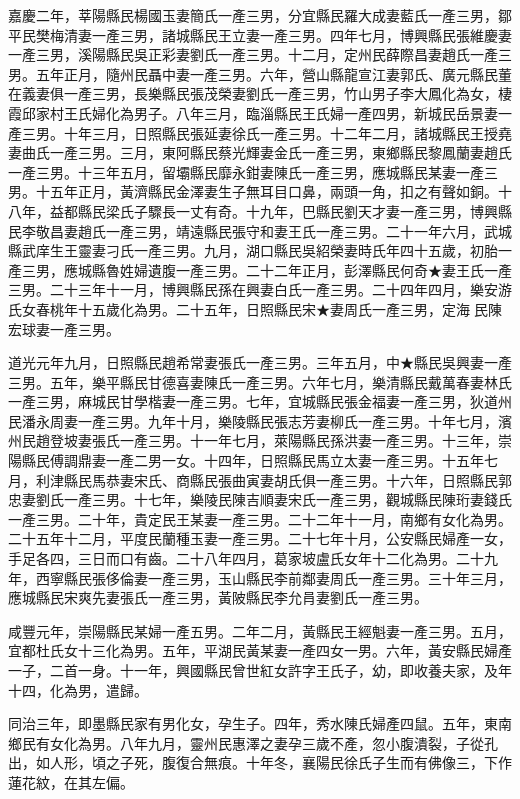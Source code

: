 \begin{pinyinscope}
嘉慶二年，莘陽縣民楊國玉妻簡氏一產三男，分宜縣民羅大成妻藍氏一產三男，鄒平民樊梅清妻一產三男，諸城縣民王立妻一產三男。四年七月，博興縣民張維慶妻一產三男，溪陽縣民吳正彩妻劉氏一產三男。十二月，定州民薛際昌妻趙氏一產三男。五年正月，隨州民聶中妻一產三男。六年，營山縣龍宣江妻郭氏、廣元縣民董在義妻俱一產三男，長樂縣民張茂榮妻劉氏一產三男，竹山男子李大鳳化為女，棲霞邱家村王氏婦化為男子。八年三月，臨淄縣民王氏婦一產四男，新城民岳景妻一產三男。十年三月，日照縣民張延妻徐氏一產三男。十二年二月，諸城縣民王授堯妻曲氏一產三男。三月，東阿縣民蔡光輝妻金氏一產三男，東鄉縣民黎鳳蘭妻趙氏一產三男。十三年五月，留壩縣民靡永鉗妻陳氏一產三男，應城縣民某妻一產三男。十五年正月，黃濟縣民金澤妻生子無耳目口鼻，兩頭一角，扣之有聲如銅。十八年，益都縣民梁氏子驟長一丈有奇。十九年，巴縣民劉天才妻一產三男，博興縣民李敬昌妻趙氏一產三男，靖遠縣民張守和妻王氏一產三男。二十一年六月，武城縣武庠生王靈妻刁氏一產三男。九月，湖口縣民吳紹榮妻時氏年四十五歲，初胎一產三男，應城縣魯姓婦遺腹一產三男。二十二年正月，彭澤縣民何奇★妻王氏一產三男。二十三年十一月，博興縣民孫在興妻白氏一產三男。二十四年四月，樂安游氏女春桃年十五歲化為男。二十五年，日照縣民宋★妻周氏一產三男，定海民陳宏球妻一產三男。

道光元年九月，日照縣民趙希常妻張氏一產三男。三年五月，中★縣民吳興妻一產三男。五年，樂平縣民甘德喜妻陳氏一產三男。六年七月，樂清縣民戴萬春妻林氏一產三男，麻城民甘學楷妻一產三男。七年，宜城縣民張金福妻一產三男，狄道州民潘永周妻一產三男。九年十月，樂陵縣民張志芳妻柳氏一產三男。十年七月，濱州民趙登坡妻張氏一產三男。十一年七月，萊陽縣民孫洪妻一產三男。十三年，崇陽縣民傅調鼎妻一產二男一女。十四年，日照縣民馬立太妻一產三男。十五年七月，利津縣民馬恭妻宋氏、商縣民張曲寅妻胡氏俱一產三男。十六年，日照縣民郭忠妻劉氏一產三男。十七年，樂陵民陳吉順妻宋氏一產三男，觀城縣民陳珩妻錢氏一產三男。二十年，貴定民王某妻一產三男。二十二年十一月，南鄉有女化為男。二十五年十二月，平度民蘭種玉妻一產三男。二十七年十月，公安縣民婦產一女，手足各四，三日而口有齒。二十八年四月，葛家坡盧氏女年十二化為男。二十九年，西寧縣民張侈倫妻一產三男，玉山縣民李前鄰妻周氏一產三男。三十年三月，應城縣民宋爽先妻張氏一產三男，黃陂縣民李允肙妻劉氏一產三男。

咸豐元年，崇陽縣民某婦一產五男。二年二月，黃縣民王經魁妻一產三男。五月，宜都杜氏女十三化為男。五年，平湖民黃某妻一產四女一男。六年，黃安縣民婦產一子，二首一身。十一年，興國縣民曾世紅女許字王氏子，幼，即收養夫家，及年十四，化為男，遣歸。

同治三年，即墨縣民家有男化女，孕生子。四年，秀水陳氏婦產四鼠。五年，東南鄉民有女化為男。八年九月，靈州民惠澤之妻孕三歲不產，忽小腹潰裂，子從孔出，如人形，頃之子死，腹復合無痕。十年冬，襄陽民徐氏子生而有佛像三，下作蓮花紋，在其左偏。


\end{pinyinscope}
